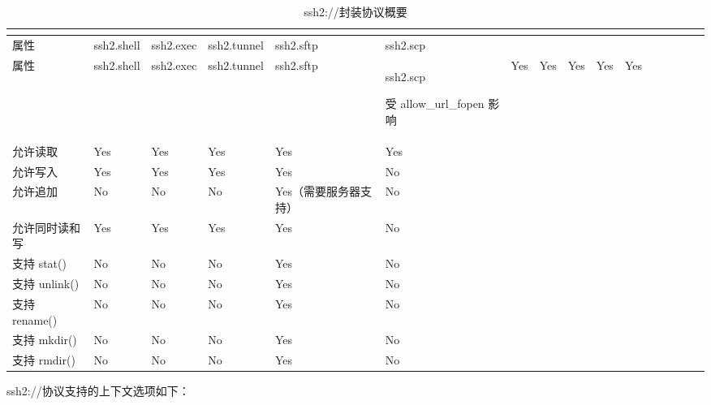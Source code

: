\begin{longtable}{|m{100pt}|m{40pt}|m{40pt}|m{40pt}|m{40pt}|m{40pt}|}
\tabularnewline\hline
属性&ssh2.shell&ssh2.exec&ssh2.tunnel&ssh2.sftp&ssh2.scp
\endhead

\caption{ssh2://封装协议概要}\\
\hline
属性&ssh2.shell&ssh2.exec&ssh2.tunnel&ssh2.sftp&ssh2.scp
\endfirsthead

\endfoot

\endlastfoot
\hline
受 allow\_url\_fopen 影响&Yes	&Yes	&Yes	&Yes	&Yes\\
\hline
允许读取				&Yes	&Yes	&Yes	&Yes	&Yes\\
\hline
允许写入				&Yes	&Yes	&Yes	&Yes	&No\\
\hline
允许追加				&No		&No		&No		&Yes（需要服务器支持）&No\\
\hline
允许同时读和写		&Yes	&Yes	&Yes	&Yes	&No\\
\hline
支持 stat()			&No		&No		&No		&Yes	&No\\
\hline
支持 unlink()			&No		&No		&No		&Yes	&No\\
\hline
支持 rename()			&No		&No		&No		&Yes	&No\\
\hline
支持 mkdir()			&No		&No		&No		&Yes	&No\\
\hline
支持 rmdir()			&No		&No		&No		&Yes	&No\\
\hline
\end{longtable}


ssh2://协议支持的上下文选项如下：

